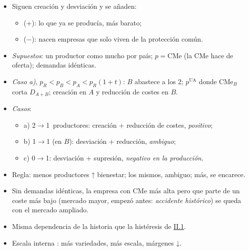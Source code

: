 \documentclass{article}
\begin{document}
\begin{columnas}
\begin{itemize}
\item Siguen creación y desviación y se añaden:
  \begin{itemize}
  \item {} (+): lo que ya se producía, más barato;
  \item {} ($-$): nacen empresas que solo viven de la protección común.
  \end{itemize}
\item \emph{Supuestos}: un productor como mucho por país; $p=\mathrm{CMe}$ (la CMe hace de oferta); demandas idénticas.
\item \emph{Caso a)}, $p_R<p_B<p_A<p_R(1+t)$: $B$ abastece a los 2; $p^{\mathrm{UA}}$ donde $\mathrm{CMe}_B$ corta $D_{A+B}$; creación en $A$ y reducción de costes en $B$.
\end{itemize}
\begin{itemize}
\item \emph{Casos}:
  \begin{itemize}
  \item a) 2$\to$1~productores: creación + reducción de costes, \emph{positivo};
  \item b) 1$\to$1 (en $B$): desviación + reducción, \emph{ambiguo};
  \item c) 0$\to$1: desviación + supresión, \emph{negativo en la producción}.
  \end{itemize}
\item Regla: menos productores ↑ bienestar; los mismos, ambiguo; más, se encarece.
\end{itemize}
\begin{itemize}
\item Sin demandas idénticas, la empresa con CMe más alta pero que parte de un coste más bajo (mercado mayor, empezó antes: \emph{accidente histórico}) se queda con el mercado ampliado.
\item Misma dependencia de la historia que la histéresis de \hyperref[rep:II.1]{II.1}.
\end{itemize}
\begin{itemize}
\item Escala interna : más variedades, más escala, márgenes ↓.

\end{itemize}
\end{columnas}
\end{document}
